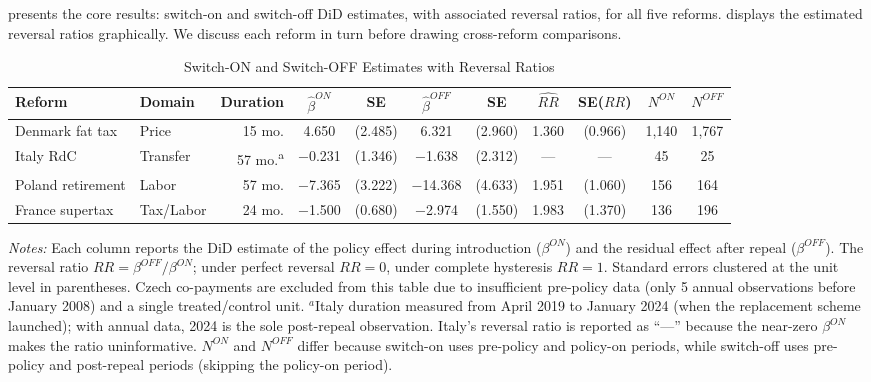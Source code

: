 \documentclass[12pt]{article}
\begin{document}
 presents the core results: switch-on and switch-off DiD estimates, with associated reversal ratios, for all five reforms.  displays the estimated reversal ratios graphically. We discuss each reform in turn before drawing cross-reform comparisons.

\begin{table}[H]
\centering
\caption{Switch-ON and Switch-OFF Estimates with Reversal Ratios}
\label{tab:main_results}
\begin{adjustbox}{max width=\textwidth}
\begin{tabular}{llrcccccccc}
\toprule
Reform & Domain & Duration & $\hat{\beta}^{ON}$ & SE & $\hat{\beta}^{OFF}$ & SE & $\widehat{RR}$ & SE($RR$) & $N^{ON}$ & $N^{OFF}$ \\
\midrule
Denmark fat tax & Price & 15 mo. & 4.650 & (2.485) & 6.321 & (2.960) & 1.360 & (0.966) & 1,140 & 1,767 \\
Italy RdC & Transfer & 57 mo.\textsuperscript{a} & $-$0.231 & (1.346) & $-$1.638 & (2.312) & --- & --- & 45 & 25 \\
Poland retirement & Labor & 57 mo. & $-$7.365 & (3.222) & $-$14.368 & (4.633) & 1.951 & (1.060) & 156 & 164 \\
France supertax & Tax/Labor & 24 mo. & $-$1.500 & (0.680) & $-$2.974 & (1.550) & 1.983 & (1.370) & 136 & 196 \\
\bottomrule
\end{tabular}
\end{adjustbox}
\par\vspace{0.3em}
{\small \textit{Notes:} Each column reports the DiD estimate of the policy effect during introduction ($\beta^{ON}$) and the residual effect after repeal ($\beta^{OFF}$). The reversal ratio $RR = \beta^{OFF}/\beta^{ON}$; under perfect reversal $RR = 0$, under complete hysteresis $RR = 1$. Standard errors clustered at the unit level in parentheses. Czech co-payments are excluded from this table due to insufficient pre-policy data (only 5 annual observations before January 2008) and a single treated/control unit. $^{a}$Italy duration measured from April 2019 to January 2024 (when the replacement scheme launched); with annual data, 2024 is the sole post-repeal observation. Italy's reversal ratio is reported as ``---'' because the near-zero $\beta^{ON}$ makes the ratio uninformative. $N^{ON}$ and $N^{OFF}$ differ because switch-on uses pre-policy and policy-on periods, while switch-off uses pre-policy and post-repeal periods (skipping the policy-on period).}
\end{table}
\end{document}
